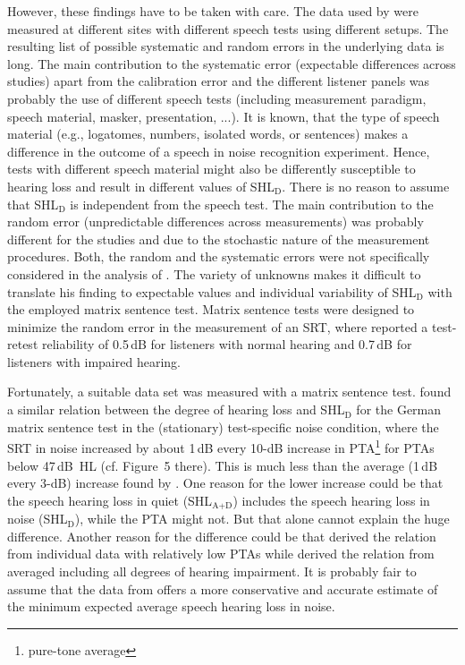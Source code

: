 \documentclass[10pt,a4paper,twocolumn]{article}
\begin{document}
However, these findings have to be taken with care.
%
The data used by \cite{plomp1978} were measured at different sites with different speech tests using different setups.
%
The resulting list of possible systematic and random errors in the underlying data is long.
%
The main contribution to the systematic error (expectable differences across studies) apart from the calibration error and the different listener panels was probably the use of different speech tests (including measurement paradigm, speech material, masker, presentation, ...).
%
It is known, that the type of speech material (e.g., logatomes, numbers, isolated words, or sentences) makes a difference in the outcome of a speech in noise recognition experiment.
%
Hence, tests with different speech material might also be differently susceptible to hearing loss and result in different values of SHL$_\text{D}$.
%
There is no reason to assume that SHL$_\text{D}$ is independent from the speech test.
%
The main contribution to the random error (unpredictable differences across measurements) was probably different for the studies and due to the stochastic nature of the measurement procedures.
%
Both, the random and the systematic errors were not specifically considered in the analysis of \cite{plomp1978}.
%
The variety of unknowns makes it difficult to translate his finding to expectable values and individual variability of SHL$_\text{D}$ with the employed matrix sentence test.
%
Matrix sentence tests were designed to minimize the random error in the measurement of an SRT, where \cite{kollmeier2015} reported a test-retest reliability of 0.5\,dB for listeners with normal hearing and 0.7\,dB for listeners with impaired hearing.

Fortunately, a suitable data set was measured with a matrix sentence test.
%
\cite{wardenga2015} found a similar relation between the degree of hearing loss and SHL$_\text{D}$ for the German matrix sentence test in the (stationary) test-specific noise condition, where the SRT in noise increased by about 1\,dB every 10-dB increase in PTA\footnote{pure-tone average} for PTAs below 47\,dB~HL (cf. Figure~5 there).
%
This is much less than the average (1\,dB every 3-dB) increase found by \cite{plomp1978}.
%
One reason for the lower increase could be that the speech hearing loss in quiet (SHL$_\text{A+D}$) includes the speech hearing loss in noise (SHL$_\text{D}$), while the PTA might not.
%
But that alone cannot explain the huge difference.
%
Another reason for the difference could be that \cite{wardenga2015} derived the relation from individual data with relatively low PTAs while \cite{plomp1978} derived the relation from averaged including all degrees of hearing impairment.
%
It is probably fair to assume that the data from \cite{wardenga2015} offers a more conservative and accurate estimate of the minimum expected average speech hearing loss in noise.
\end{document}
